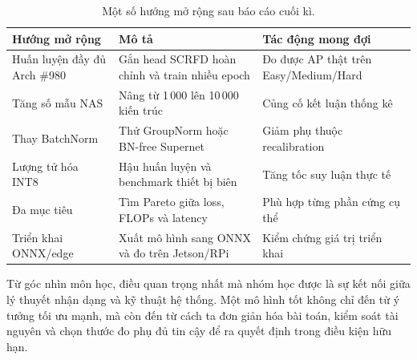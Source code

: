 \begin{table}[H]
\centering
\caption{Một số hướng mở rộng sau báo cáo cuối kì.}
\begin{tabular}{@{}p{}p{}p{}@{}}
\toprule
\textbf{Hướng mở rộng} & \textbf{Mô tả} & \textbf{Tác động mong đợi} \\
\midrule
Huấn luyện đầy đủ Arch \#980 & Gắn head SCRFD hoàn chỉnh và train nhiều epoch & Đo được AP thật trên Easy/Medium/Hard \\
Tăng số mẫu NAS & Nâng từ 1\,000 lên 10\,000 kiến trúc & Củng cố kết luận thống kê \\
Thay BatchNorm & Thử GroupNorm hoặc BN-free Supernet & Giảm phụ thuộc recalibration \\
Lượng tử hóa INT8 & Hậu huấn luyện và benchmark thiết bị biên & Tăng tốc suy luận thực tế \\
Đa mục tiêu & Tìm Pareto giữa loss, FLOPs và latency & Phù hợp từng phần cứng cụ thể \\
Triển khai ONNX/edge & Xuất mô hình sang ONNX và đo trên Jetson/RPi & Kiểm chứng giá trị triển khai \\
\bottomrule
\end{tabular}
\end{table}

Từ góc nhìn môn học, điều quan trọng nhất mà nhóm học được là sự kết nối giữa lý thuyết nhận dạng và kỹ thuật hệ thống. Một mô hình tốt không chỉ đến từ ý tưởng tối ưu mạnh, mà còn đến từ cách ta đơn giản hóa bài toán, kiểm soát tài nguyên và chọn thước đo phụ đủ tin cậy để ra quyết định trong điều kiện hữu hạn.
